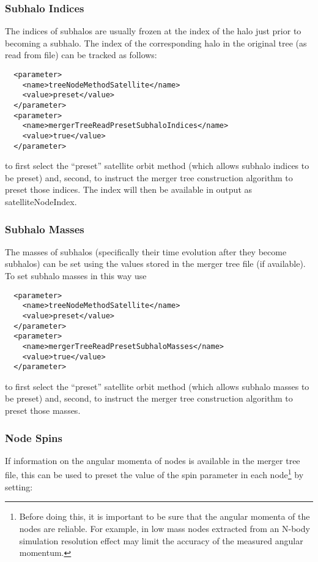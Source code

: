 \subsubsection{Subhalo Indices}

The indices of subhalos are usually frozen at the index of the halo just prior to becoming a subhalo. The index of the corresponding halo in the original tree (as read from file) can be tracked as follows:
\begin{verbatim}
  <parameter>
    <name>treeNodeMethodSatellite</name>
    <value>preset</value>    
  </parameter>
  <parameter>
    <name>mergerTreeReadPresetSubhaloIndices</name>
    <value>true</value>
  </parameter>
\end{verbatim}
to first select the ``preset'' satellite orbit method (which allows subhalo indices to be preset) and, second, to instruct the merger tree construction algorithm to preset those indices. The index will then be available in output as {\normalfont \ttfamily satelliteNodeIndex}.

\subsubsection{Subhalo Masses}

The masses of subhalos (specifically their time evolution after they become subhalos) can be set using the values stored in the merger tree file (if available). To set subhalo masses in this way use
\begin{verbatim}
  <parameter>
    <name>treeNodeMethodSatellite</name>
    <value>preset</value>    
  </parameter>
  <parameter>
    <name>mergerTreeReadPresetSubhaloMasses</name>
    <value>true</value>
  </parameter>
\end{verbatim}
to first select the ``preset'' satellite orbit method (which allows subhalo masses to be preset) and, second, to instruct the merger tree construction algorithm to preset those masses.

\subsubsection{Node Spins}

If information on the angular momenta of nodes is available in the merger tree file, this can be used to preset the value of the spin parameter in each node\footnote{Before doing this, it is important to be sure that the angular momenta of the nodes are reliable. For example, in low mass nodes extracted from an N-body simulation resolution effect may limit the accuracy of the measured angular momentum.} by setting:


